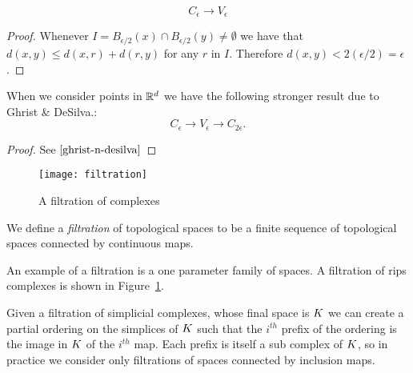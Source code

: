 \begin{theorem}
\[ C_\epsilon \rightarrow V_\epsilon \]
\end{theorem}
\begin{proof}
Whenever $I = B_{\epsilon/2}(x) \cap B_{\epsilon/2}(y) \neq \emptyset$ we have that $d(x,y) \leq d(x,r) + d(r,y)$ for any $r$ in $I$. Therefore $d(x,y) < 2(\epsilon/2) = \epsilon$. 
\end{proof}
\begin{theorem}
When we consider points in $\mathbb{R}^d$ we have the following stronger result due to Ghrist \& DeSilva.:
\[ C_\epsilon \rightarrow V_\epsilon \rightarrow C_{2\epsilon}. \]
\end{theorem}
\begin{proof}
See $\cite{ghrist-n-desilva}$
\end{proof}
\begin{figure}
\centering
\texttt{[image: filtration]}
\caption{A filtration of complexes}
\label{fig:rips-filt}
\end{figure}
\begin{definition}
We define a \emph{filtration} of topological spaces to be a finite sequence of topological spaces connected by
continuous maps.
\end{definition} 
An example of a filtration is a one parameter family of spaces. A filtration of rips complexes is shown in Figure~\ref{fig:rips-filt}.

Given a filtration of simplicial complexes, whose final space is $K$ we can create a  
partial ordering on the simplices of $K$ such that the $i^{th}$ prefix of the ordering is the image in $K$ of the $i^{th}$ map. Each prefix is itself a sub complex of $K$, so in practice we consider only filtrations of spaces connected by inclusion maps.

